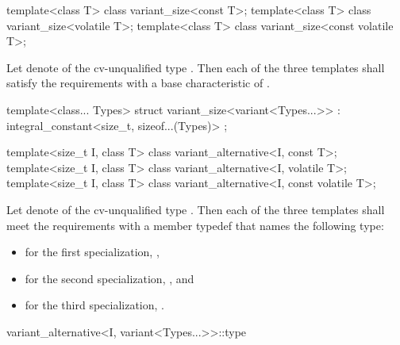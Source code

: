 %
\begin{itemdecl}
template<class T> class variant_size<const T>;
template<class T> class variant_size<volatile T>;
template<class T> class variant_size<const volatile T>;
\end{itemdecl}

\begin{itemdescr}
\pnum
Let  denote  of the cv-unqualified
type . Then each of the three templates shall satisfy the
 requirements with a
base characteristic of .
\end{itemdescr}

%
\begin{itemdecl}
template<class... Types>
  struct variant_size<variant<Types...>> : integral_constant<size_t, sizeof...(Types)> { };
\end{itemdecl}

%
\begin{itemdecl}
template<size_t I, class T> class variant_alternative<I, const T>;
template<size_t I, class T> class variant_alternative<I, volatile T>;
template<size_t I, class T> class variant_alternative<I, const volatile T>;
\end{itemdecl}

\begin{itemdescr}
\pnum
Let  denote  of the
cv-unqualified type . Then each of the three templates shall
meet the  requirements with a
member typedef  that names the following type:
\begin{itemize}
\item for the first specialization, ,
\item for the second specialization, , and
\item for the third specialization, .
\end{itemize}
\end{itemdescr}

%
\begin{itemdecl}
variant_alternative<I, variant<Types...>>::type
\end{itemdecl}

